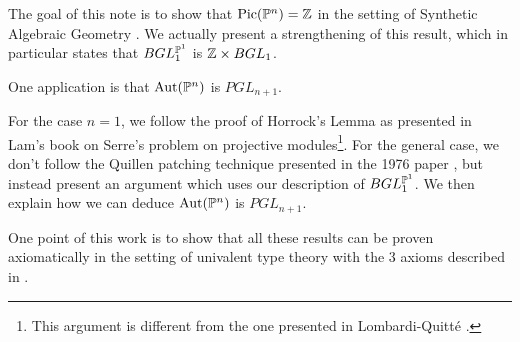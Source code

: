 The goal of this note is to show that $\mathrm{Pic}(\mathbb{P}^n) = \mathbb{Z}$ in the setting of Synthetic Algebraic
Geometry \cite{draft}. We actually present a strengthening of this result,
which in particular states that $BGL_1^{\mathbb{P}^1}$ is $\mathbb{Z}\times BGL_1$.

One application is that $\mathrm{Aut}(\mathbb{P}^n)$ is $PGL_{n+1}$.

For the case $n=1$,
we follow the proof of Horrock's Lemma as presented in Lam's book on Serre's problem \cite{Lam}
on projective modules\footnote{This argument is different from the one presented in Lombardi-Quitt\'e \cite{lombardi-quitte}.}.
For the general case, we don't follow the Quillen patching technique
presented in the 1976 paper \cite{Quillen}, but instead present an argument which uses
our description of $BGL_1^{\mathbb{P}^1}$.
We then explain how we can deduce $\mathrm{Aut}(\mathbb{P}^n)$ is $PGL_{n+1}$.

 One point of this work is to show that all these results can be proven axiomatically in the
 setting of univalent type theory with the 3 axioms described in \cite{draft}.

